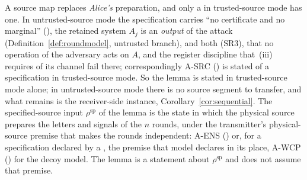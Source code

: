 
A source map replaces \emph{Alice's} preparation, and only a
 in trusted-source mode has one. In
untrusted-source mode the specification carries ``no certificate and no
marginal'' (), the retained system $A_j$ is
an \emph{output} of the attack (Definition~\ref{def:roundmodel}, untrusted
branch), and both (SR3), that no operation of the adversary acts on $A$, and
the register discipline that \,(iii)
requires of its channel fail there; correspondingly A-SRC
() is stated of a specification in trusted-source
mode. So
the lemma is stated in trusted-source mode alone; in untrusted-source mode
there is no source segment to transfer, and what remains is the receiver-side
instance, Corollary~\ref{cor:sequential}. The specified-source input
$\rho^{\mathrm{sp}}$ of the lemma is the state in which the physical source prepares
the letters and signals of the $n$ rounds, under the transmitter's
physical-source premise that makes the rounds independent: A-ENS
() or, for a specification declared by a
, the premise that model declares in its place, A-WCP
() for the decoy model. The lemma is a
statement about $\rho^{\mathrm{sp}}$ and does not assume that premise.

